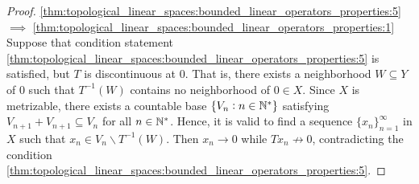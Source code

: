 \begin{proof}
\ref{thm:topological_linear_spaces:bounded_linear_operators_properties:5}
$\implies$ 
\ref{thm:topological_linear_spaces:bounded_linear_operators_properties:1}
Suppose that condition statement 
\ref{thm:topological_linear_spaces:bounded_linear_operators_properties:5} 
is satisfied, but $T$ is discontinuous at $0$. 
That is, there exists a neighborhood $W \subseteq Y$ of $0$ such that 
$T^{-1}(W)$ contains no neighborhood of $0 \in X$. 
Since $X$ is metrizable, there exists a countable base $\{V_n: n \in \mathbb{N}^\ast\}$ 
satisfying $V_{n + 1} + V_{n + 1} \subseteq V_n$ for all $n \in \mathbb{N}^\ast$. 
Hence, it is valid to find a sequence $\{ x_n \}_{n=1}^{\infty}$ in $X$ 
such that $x_n \in V_n \backslash T^{-1}(W)$. 
Then $x_n \to 0$ while $Tx_n \not \to 0$, contradicting the condition 
\ref{thm:topological_linear_spaces:bounded_linear_operators_properties:5}. 
\end{proof}

